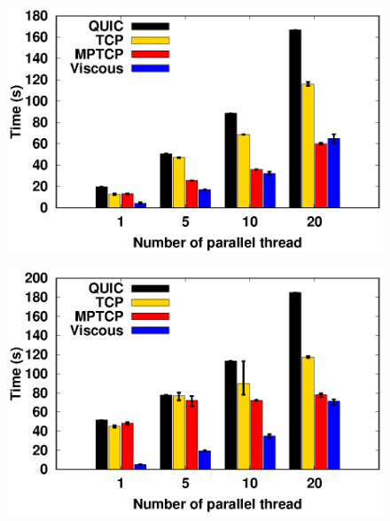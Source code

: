 \begin{figure}[!t]
    \begin{center}
        \begin{minipage}{0.45\linewidth}
            \centering
            \includegraphics[width=\linewidth]{img/exp6/time_elapsed_1}
            \label{fig:exp6_time_16}
        \end{minipage}
        \begin{minipage}{0.45\linewidth}
            \centering
            \includegraphics[width=\linewidth]{img/exp6/time_elapsed_5}

\end{minipage}
\end{center}
\end{figure}
